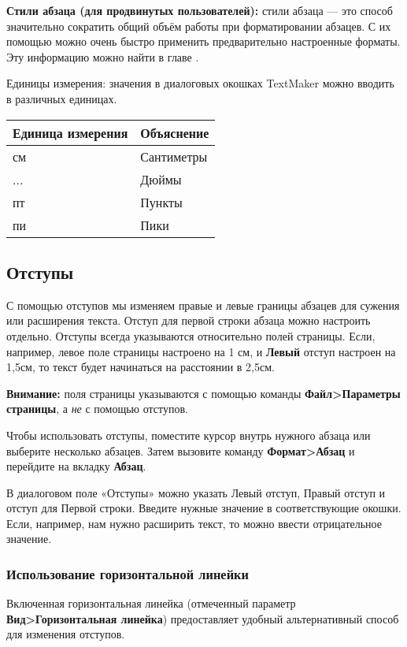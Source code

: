 ﻿\documentclass[a4paper,10pt]{article}
\begin{document}
\textbf{Стили абзаца (для продвинутых пользователей):} стили абзаца — это способ значительно сократить общий объём работы при форматировании абзацев. С их помощью можно очень быстро применить предварительно настроенные форматы. Эту информацию можно найти в главе .

Единицы измерения: значения в диалоговых окошках TextMaker можно вводить в различных единицах.

\begin{center}
\begin{tabular}{ | m{4cm} | m{4cm} | }
\hline
 \textbf{Единица измерения} & \textbf{Объяснение} \\ 
 \hline
 см & Сантиметры\\
\hline
... & Дюймы\\
\hline
пт & Пункты \\
\hline
пи & Пики\\
\hline
\end{tabular}
\end{center}

\subsection{Отступы} \label{sec:отступы}
С помощью отступов мы изменяем правые и левые границы абзацев для сужения или расширения текста. Отступ для первой строки абзаца можно настроить отдельно.
Отступы всегда указываются относительно полей страницы. Если, например, левое поле страницы настроено на 1 см, и \textbf{Левый} отступ настроен на 1,5см, то текст будет начинаться на расстоянии в 2,5см.

\begin{mdframed}[backgroundcolor=blue!10]
\textbf{Внимание:} поля страницы указываются с помощью команды \textbf{Файл>Параметры страницы}, а \textit{не} с помощью отступов.
\end{mdframed}

Чтобы использовать отступы, поместите курсор внутрь нужного абзаца или выберите несколько абзацев. Затем вызовите команду \textbf{Формат>Абзац} и перейдите на вкладку \textbf{Абзац}.

В диалоговом поле «Отступы»  можно указать Левый отступ, Правый отступ и отступ для Первой строки. Введите нужные значение в соответствующие окошки.
Если, например, нам нужно расширить текст, то можно ввести отрицательное значение.

\subsubsection{Использование горизонтальной линейки}
Включенная горизонтальная линейка (отмеченный параметр \textbf{Вид>Горизонтальная линейка}) предоставляет удобный альтернативный способ для изменения отступов.
\end{document}

